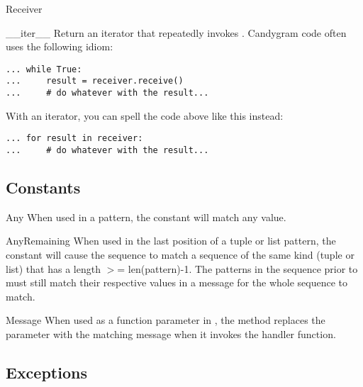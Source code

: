 \documentclass{howto}
\newcommand{\greaterthan}[0]{\begin{math}>\end{math}}
\newcommand{\greaterthan}[0]{>}
\begin{document}
\begin{classdesc}{Receiver}{}
\begin{methoddesc}{__iter__}{}
Return an iterator that repeatedly invokes . Candygram code
often uses the following idiom:
\begin{verbatim}
... while True:
...     result = receiver.receive()
...     # do whatever with the result...
\end{verbatim}
With an iterator, you can spell the code above like this instead:
\begin{verbatim}
... for result in receiver:
...     # do whatever with the result...
\end{verbatim}
\end{methoddesc}

\end{classdesc}



\subsection{Constants}

\begin{datadesc}{Any}
When used in a pattern, the  constant will match any value.
\end{datadesc}

\begin{datadesc}{AnyRemaining}
When used in the last position of a tuple or list pattern, the
 constant will cause the sequence to match a sequence of
the same kind (tuple or list) that has a length \greaterthan= len(pattern)-1.
The patterns in the sequence prior to  must still match
their respective values in a message for the whole sequence to match.
\end{datadesc}

\begin{datadesc}{Message}
When used as a function parameter in , the
 method replaces the parameter with the matching
message when it invokes the handler function.
\end{datadesc}



\subsection{Exceptions}
\end{document}
